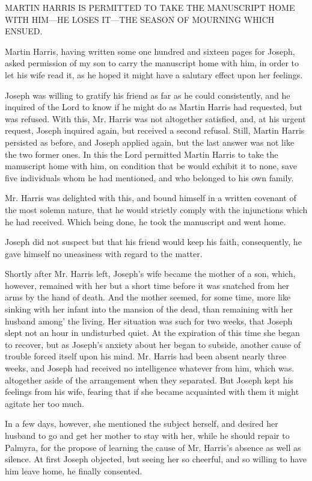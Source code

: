 		MARTIN HARRIS IS PERMITTED TO TAKE THE MANUSCRIPT HOME WITH HIM---HE LOSES IT---THE SEASON OF MOURNING WHICH ENSUED.

		Martin Harris, having written some one hundred and sixteen pages for Joseph, asked permission of my son to carry the manuscript home with him, in order to let his wife read it, as he hoped it might have a salutary effect upon her feelings.

		Joseph was willing to gratify his friend as far as he could consistently, and he inquired of the Lord to know if he might do as Martin Harris had requested, but was refused. With this, Mr. Harris was not altogether satisfied, and, at his urgent request, Joseph inquired again, but received a second refusal. Still, Martin Harris persisted as before, and Joseph applied again, but the last answer was not like the two former ones. In this the Lord permitted Martin Harris to take the manuscript home with him, on condition that be would exhibit it to none, save five individuals whom he had mentioned, and who belonged to his own family.

		 Mr. Harris was delighted with this, and bound himself in a written covenant of the most solemn nature, that he would strictly comply with the injunctions which he had received. Which being done, he took the manuscript and went home.

		Joseph did not suspect but that his friend would keep his faith, consequently, he gave himself no uneasiness with regard to the matter.

		Shortly after Mr. Harris left, Joseph's wife became the mother of a son, which, however, remained with her but a short time before it was snatched from her arms by the hand of death. And the mother seemed, for some time, more like sinking with her infant into the mansion of the dead, than remaining with her husband among' the living. Her situation was such for two weeks, that Joseph slept not an hour in undisturbed quiet. At the expiration of this time she began to recover, but as Joseph's anxiety about her began to subside, another cause of trouble forced itself upon his mind. Mr. Harris had been absent nearly three weeks, and Joseph had received no intelligence whatever from him, which was. altogether aside of the arrangement when they separated. But Joseph kept his feelings from his wife, fearing that if she became acquainted with them it might agitate her too much.

		In a few days, however, she mentioned the subject herself, and desired her husband to go and get her mother to stay with her, while he should repair to Palmyra, for the propose of learning the cause of Mr. Harris's absence as well as silence. At first Joseph objected, but seeing her so cheerful, and so willing to have him leave home, he finally consented.

